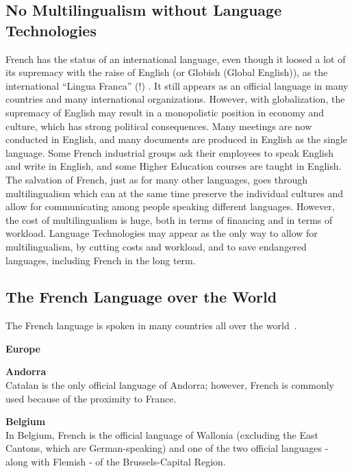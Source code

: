 \begin{multicols}{2}
\subsection{No Multilingualism without Language Technologies}

French has the status of an international language, even though it
loosed a lot of its supremacy with the raise of English (or Globish
(Global English)), as the international ``Lingua Franca'' (!) \cite{ostler2010}. It still
appears as an official language in many countries and many
international organizations. However, with globalization, the
supremacy of English may result in a monopolistic position in economy
and culture, which has strong political consequences. Many meetings
are now conducted in English, and many documents are produced in
English as the single language. Some French industrial groups ask
their employees to speak English and write in English, and some Higher
Education courses are taught in English. The salvation of French, just
as for many other languages, goes through multilingualism which can at
the same time preserve the individual cultures and allow for
communicating among people speaking different languages. However, the
cost of multilingualism is huge, both in terms of financing and in
terms of workload. Language Technologies may appear as the only way to
allow for multilingualism, by cutting costs and workload, and to save
endangered languages, including French in the long term.

\subsection{The French Language over the World}
\label{frenchLanguageInTheWorldEn}
The French language is spoken in many countries all over the world~\cite{francais}.

\vspace{1cm}
\begin{center}
{\bf {\sc Europe}}
\end{center}

{\bf Andorra}\\
Catalan is the only official language of Andorra; however, French is
commonly used because of the proximity to France.

{\bf Belgium}\\ 
In Belgium, French is the official language of Wallonia (excluding the
East Cantons, which are German-speaking) and one of the two official
languages - along with Flemish - of the Brussels-Capital Region.


\end{multicols}

